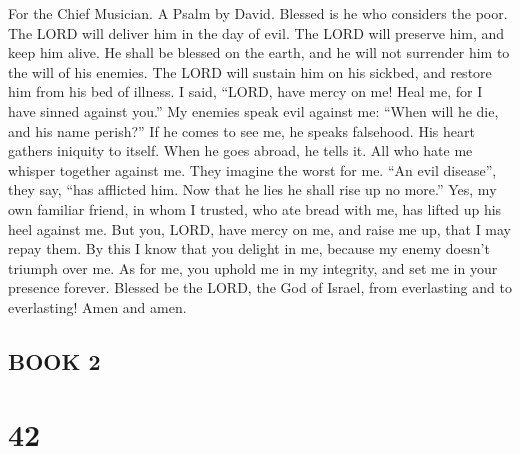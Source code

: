 For the Chief Musician. A Psalm by David.  Blessed is he who
considers the poor. The LORD will deliver him in the day of evil.
 The LORD will preserve him, and keep him alive. He shall be
blessed on the earth, and he will not surrender him to the will of his
enemies.  The LORD will sustain him on his sickbed, and
restore him from his bed of illness.  I said, ``LORD, have
mercy on me! Heal me, for I have sinned against you.''  My
enemies speak evil against me: ``When will he die, and his name
perish?''  If he comes to see me, he speaks falsehood. His
heart gathers iniquity to itself. When he goes abroad, he tells it.
 All who hate me whisper together against me. They imagine
the worst for me.  ``An evil disease'', they say, ``has
afflicted him. Now that he lies he shall rise up no more.'' 
Yes, my own familiar friend, in whom I trusted, who ate bread with me,
has lifted up his heel against me.  But you, LORD, have
mercy on me, and raise me up, that I may repay them.  By
this I know that you delight in me, because my enemy doesn't triumph
over me.  As for me, you uphold me in my integrity, and set
me in your presence forever.  Blessed be the LORD, the God
of Israel, from everlasting and to everlasting! Amen and amen.

\hypertarget{book-2}{%
\subsection{BOOK 2}\label{book-2}}

\hypertarget{section-41}{%
\section{42}\label{section-41}}

